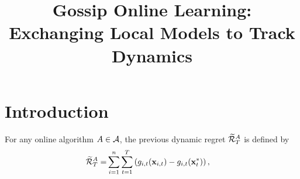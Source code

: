 \documentclass{article}
\title{Gossip Online Learning: Exchanging Local Models to Track Dynamics}
\begin{document}
\maketitle

\begin{abstract}





\end{abstract}


\section{Introduction}
\label{sect_introduction}

For any online algorithm $A \in {\mathcal{A}}$, the previous dynamic regret $\widetilde{{\mathcal{R}}}_T^{A}$ is defined by
\begin{align}
\label{equa_definition_previous_regret}
\widetilde{{\mathcal{R}}}_T^{A} = &  \sum_{i=1}^n\sum_{t=1}^T \left(  g_{i,t}({\bf x}_{i,t}) - g_{i,t}({\bf x}_t^\ast)  \right),
\end{align} 
\end{document}
